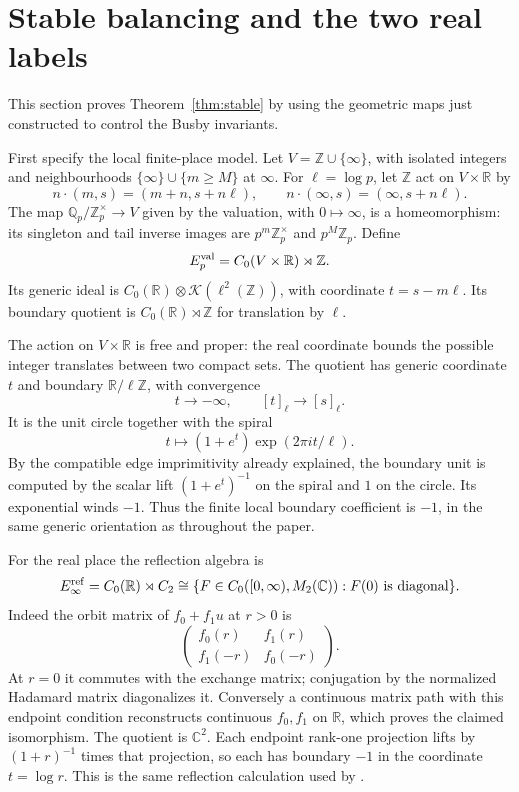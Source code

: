 \documentclass[11pt]{article}
\newcommand{\Z}{\mathbb Z}
\newcommand{\Q}{\mathbb Q}
\newcommand{\R}{\mathbb R}
\newcommand{\C}{\mathbb C}
\newcommand{\K}{\mathcal K}
\theoremstyle{definition}
\theoremstyle{remark}
\begin{document}
\section{Stable balancing and the two real labels}

This section proves Theorem~\ref{thm:stable} by using the geometric maps just constructed to control the Busby invariants.

First specify the local finite-place model. Let $V=\Z\cup\{\infty\}$, with isolated integers and neighbourhoods $\{\infty\}\cup\{m\geq M\}$ at $\infty$. For $\ell=\log p$, let $\Z$ act on $V\times\R$ by
\[
 n\cdot(m,s)=(m+n,s+n\ell),\qquad
 n\cdot(\infty,s)=(\infty,s+n\ell).
\]
The map $\Q_p/\Z_p^\times\to V$ given by the valuation, with $0\mapsto\infty$, is a homeomorphism: its singleton and tail inverse images are $p^m\Z_p^\times$ and $p^M\Z_p$. Define
\[
 E_p^{\rm val}=C_0(V\times\R)\rtimes\Z.
\]
Its generic ideal is $C_0(\R)\otimes\K(\ell^2(\Z))$, with coordinate $t=s-m\ell$. Its boundary quotient is $C_0(\R)\rtimes\Z$ for translation by $\ell$.

The action on $V\times\R$ is free and proper: the real coordinate bounds the possible integer translates between two compact sets. The quotient has generic coordinate $t$ and boundary $\R/\ell\Z$, with convergence
\[
 t\to-\infty,\qquad [t]_\ell\to[s]_\ell.
\]
It is the unit circle together with the spiral
\[
 t\longmapsto(1+e^t)\exp(2\pi it/\ell).
\]
By the compatible edge imprimitivity already explained, the boundary unit is computed by the scalar lift $(1+e^t)^{-1}$ on the spiral and $1$ on the circle. Its exponential winds $-1$. Thus the finite local boundary coefficient is $-1$, in the same generic orientation as throughout the paper.

For the real place the reflection algebra is
\[
 E_\infty^{\rm ref}=C_0(\R)\rtimes C_2
 \cong\{F\in C_0([0,\infty),M_2(\C)):F(0)\text{ is diagonal}\}.
\]
Indeed the orbit matrix of $f_0+f_1u$ at $r>0$ is
\[
 \begin{pmatrix}f_0(r)&f_1(r)\\f_1(-r)&f_0(-r)\end{pmatrix}.
\]
At $r=0$ it commutes with the exchange matrix; conjugation by the normalized Hadamard matrix diagonalizes it. Conversely a continuous matrix path with this endpoint condition reconstructs continuous $f_0,f_1$ on $\R$, which proves the claimed isomorphism. The quotient is $\C^2$. Each endpoint rank-one projection lifts by $(1+r)^{-1}$ times that projection, so each has boundary $-1$ in the coordinate $t=\log r$. This is the same reflection calculation used by \citet[Lemma 5.6, pp.~26--27]{CC}.
\end{document}
